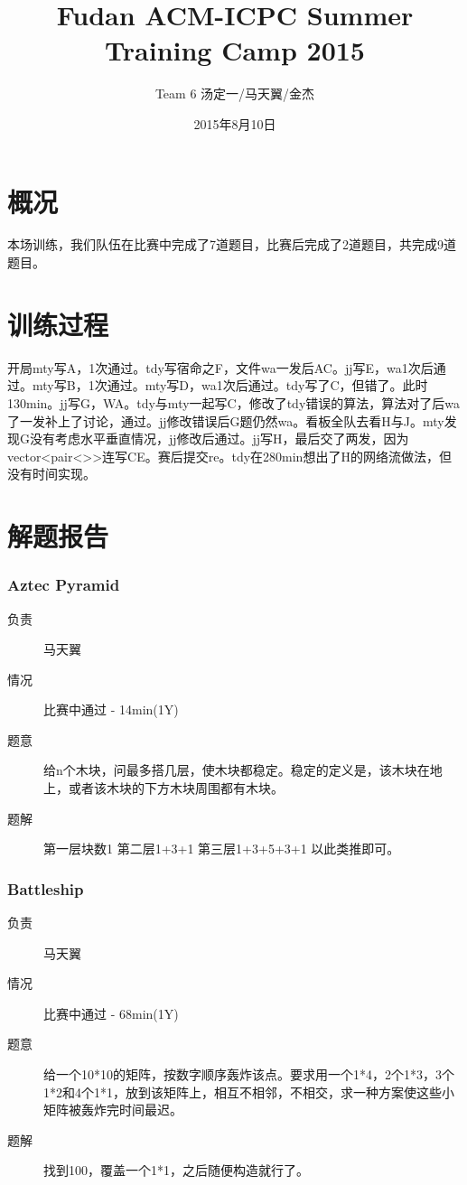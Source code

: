 \documentclass[a4paper, 11pt, nofonts, nocap, fancyhdr]{ctexart}
\title{Fudan ACM-ICPC Summer Training Camp 2015}
\author{Team 6 汤定一/马天翼/金杰}
\date{2015年8月10日}
\newcommand{\problem}[1]{\subsubsection{#1}}
\begin{document}
\maketitle

\section{概况}

本场训练，我们队伍在比赛中完成了7道题目，比赛后完成了2道题目，共完成9道题目。

\section{训练过程}

开局mty写A，1次通过。tdy写宿命之F，文件wa一发后AC。jj写E，wa1次后通过。mty写B，1次通过。mty写D，wa1次后通过。tdy写了C，但错了。此时130min。jj写G，WA。tdy与mty一起写C，修改了tdy错误的算法，算法对了后wa了一发补上了讨论，通过。jj修改错误后G题仍然wa。看板全队去看H与J。mty发现G没有考虑水平垂直情况，jj修改后通过。jj写H，最后交了两发，因为vector<pair<>>连写CE。赛后提交re。tdy在280min想出了H的网络流做法，但没有时间实现。

\section{解题报告}

\problem{Aztec Pyramid}

\begin{description}
\item[负责] 马天翼
\item[情况] 比赛中通过 - 14min(1Y)
\item[题意]
给n个木块，问最多搭几层，使木块都稳定。稳定的定义是，该木块在地上，或者该木块的下方木块周围都有木块。
\item[题解]
第一层块数1
第二层1+3+1
第三层1+3+5+3+1
以此类推即可。
\end{description}

\problem{Battleship}

\begin{description}
\item[负责] 马天翼
\item[情况] 比赛中通过 - 68min(1Y)
\item[题意]
给一个10*10的矩阵，按数字顺序轰炸该点。要求用一个1*4，2个1*3，3个1*2和4个1*1，放到该矩阵上，相互不相邻，不相交，求一种方案使这些小矩阵被轰炸完时间最迟。
\item[题解]
找到100，覆盖一个1*1，之后随便构造就行了。
\end{description}
\end{document}
